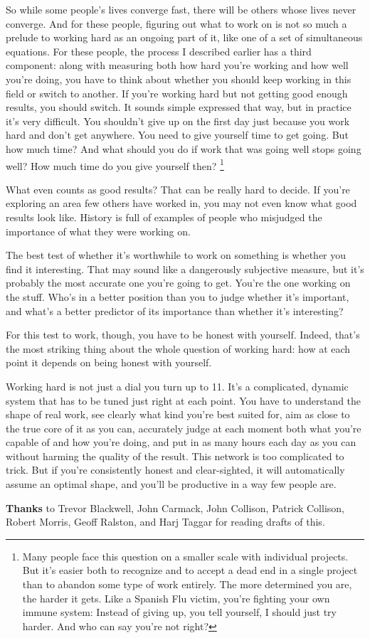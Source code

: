 So while some people's lives converge fast, there will be others whose
lives never converge. And for these people, figuring out what to work on
is not so much a prelude to working hard as an ongoing part of it, like
one of a set of simultaneous equations. For these people, the process I
described earlier has a third component: along with measuring both how
hard you're working and how well you're doing, you have to think about
whether you should keep working in this field or switch to another. If
you're working hard but not getting good enough results, you should
switch. It sounds simple expressed that way, but in practice it's very
difficult. You shouldn't give up on the first day just because you work
hard and don't get anywhere. You need to give yourself time to get
going. But how much time? And what should you do if work that was going
well stops going well? How much time do you give yourself then?
\footnote{Many people face this question on a smaller scale with
individual projects. But it's easier both to recognize and to accept a
dead end in a single project than to abandon some type of work entirely.
The more determined you are, the harder it gets. Like a Spanish Flu
victim, you're fighting your own immune system: Instead of giving up,
you tell yourself, I should just try harder. And who can say you're not
right?}

What even counts as good results? That can be really hard to decide. If
you're exploring an area few others have worked in, you may not even
know what good results look like. History is full of examples of people
who misjudged the importance of what they were working on.

The best test of whether it's worthwhile to work on something is whether
you find it interesting. That may sound like a dangerously subjective
measure, but it's probably the most accurate one you're going to get.
You're the one working on the stuff. Who's in a better position than you
to judge whether it's important, and what's a better predictor of its
importance than whether it's interesting?

For this test to work, though, you have to be honest with yourself.
Indeed, that's the most striking thing about the whole question of
working hard: how at each point it depends on being honest with
yourself.

Working hard is not just a dial you turn up to 11. It's a complicated,
dynamic system that has to be tuned just right at each point. You have
to understand the shape of real work, see clearly what kind you're best
suited for, aim as close to the true core of it as you can, accurately
judge at each moment both what you're capable of and how you're doing,
and put in as many hours each day as you can without harming the quality
of the result. This network is too complicated to trick. But if you're
consistently honest and clear-sighted, it will automatically assume an
optimal shape, and you'll be productive in a way few people are.


\textbf{Thanks} to Trevor Blackwell, John Carmack, John Collison,
Patrick Collison, Robert Morris, Geoff Ralston, and Harj Taggar for
reading drafts of this.